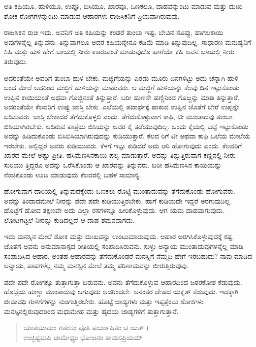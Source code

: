 {\small ಅತಿ ಕಹಿಯೂ, ಹುಳಿಯೂ, ಉಪ್ಪೂ, ಬಿಸಿಯೂ, ಖಾರವೂ, ಒಣಕಲೂ, ದಾಹವನ್ನುಂಟು ಮಾಡುವ ಮತ್ತು ದುಃಖ ಶೋಕ ರೋಗಗಳನ್ನುಂಟು ಮಾಡುವ ಆಹಾರಗಳು ರಾಜಸಿಕನಿಗೆ ಪ್ರಿಯವಾಗಿರುವುವು.}

ರಾಜಸಿಕನ ರುಚಿ ಇದು. ಅವನಿಗೆ ಅತಿ ಕಹಿಯನ್ನು ಕಂಡರೆ ತುಂಬಾ ಇಷ್ಟ. ಬೇವಿನ ಸೊಪ್ಪು, ಹಾಗಲಕಾಯಿ ಅವುಗಳನ್ನೆಲ್ಲ ತಿನ್ನುವನು. ತಿನ್ನುವಾಗಲೂ ಅದರ ಕಹಿಯನ್ನೇನೂ ಕಡಿಮೆ ಮಾಡಿ ತಿನ್ನುವುದಿಲ್ಲ. ಸಾಧಾರಣ ಮನುಷ್ಯನಿಗೆ ಸಿಹಿ ಮತ್ತು ಹುಳಿ ಹೇಗೆ ಬಾಯಲ್ಲಿ ನೀರು ಊರುವಂತೆ ಮಾಡುವುದೊ ಹಾಗೆಯೇ ಕಹಿ ಅವನ ಬಾಯಲ್ಲಿ ನೀರು ತರುವುದು.

ಅದರಂತೆಯೇ ಅವರಿಗೆ ತುಂಬಾ ಹುಳಿ ಬೇಕು. ಮಜ್ಜಿಗೆಯನ್ನು ಎರಡು ಮೂರು ದಿನಗಳಿಟ್ಟು ಅದು ಚೆನ್ನಾಗಿ ಹುಳಿ ಬಂದ ಮೇಲೆ ಅದರಿಂದ ಮಜ್ಜಿಗೆ ಹುಳಿಯನ್ನು ಮಾಡುವರು. ಆ ಮಜ್ಜಿಗೆ ಹುಳಿಯನ್ನು ಕೆಲವು ದಿನ ಇಟ್ಟುಕೊಂಡು ಉಪ್ಪಿನ ಕಾಯಿಯಂತೆ ಅಥವಾ ಗೊಜ್ಜಿನಂತೆ ತಿನ್ನುತ್ತಾರೆ. ಬರೀ ಹುಣಸೇ ಹಣ್ಣಿನಿಂದ ಗೊಜ್ಜನ್ನು ಮಾಡಿ ತಿನ್ನುತ್ತಾರೆ. ಅದರಂತೆಯೇ ಕೆಲವರಿಗೆ ಉಪ್ಪು ಜಾಸ್ತಿ ಬೇಕು. ಎಲೆಯಲ್ಲಿ ಪದಾರ್ಥಕ್ಕೆ ಹಾಕುವ ಉಪ್ಪಿನ ಜೊತೆಗೆ ಬೇರೆ ಉಪ್ಪನ್ನೇ ಬಡಿಸುವರು. ಜಾಸ್ತಿ ಬೇಕಾದರೆ ತೆಗೆದುಕೊಳ್ಳಲಿ ಎಂದು. ತೆಗೆದುಕೊಳ್ಳುವಾಗ ಕಾಫಿ, ಟೀ ಮುಂತಾದವು ತುಂಬಾ ಬಿಸಿಯಾಗಿರಬೇಕು. ಅದಿರುವ ಪಾತ್ರೆಯ ಬಿಸಿಯನ್ನು ಅವರ ಕೈ ತಡೆಯುವುದಿಲ್ಲ. ಒಂದು ಕೈಯಲ್ಲಿ ಬಟ್ಟೆ ಇಟ್ಟುಕೊಂಡು ಅದನ್ನು ಹಿಡಿದುಕೊಂಡು ಬಿಸಿಬಿಸಿಯಾಗಿರುವುದನ್ನು ಕುಡಿಯುತ್ತಾರೆ. ಕೆಲವ ರಿಗೆ ಟೀ ಅಥವಾ ಕಾಫಿ ಒಲೆಯ ಮೇಲೆಯೆ ಇರಬೇಕು. ಅಲ್ಲಿದ್ದರೆ ಅವರು ಕುಡಿಯುವರು. ಕೆಳಗೆ ಇಟ್ಟು ಕುಡಿದರೆ ಅದು ಆರಿ ಹೋಗುವುದು ಎಂದು. ಕೆಲವರಿಗೆ ಖಾರದ ಮೇಲೆ ಅಷ್ಟು ಪ್ರೀತಿ. ಹಸಿಮೆಣಸಿನಕಾಯಿ ಪಲ್ಯ ಮಾಡುತ್ತಾರೆ. ಅದನ್ನು ತಿನ್ನುತ್ತಿರುವಾಗ ಕಣ್ಣಿನಲ್ಲಿ ನೀರು ಸುರಿಯು ತ್ತಿದ್ದರೂ ಅದನ್ನು ಒರೆಸಿಕೊಂಡು ಆ ಖಾರವನ್ನು ತಿನ್ನುವರು. ಬರೀ ಹಸಿಮೆಣಸಿನ ಕಾಯಿಯನ್ನು ನೆಂಚಿಕೊಂಡು ಊಟ ಮಾಡುವುದು ಕೆಲವರಲ್ಲಿ ಬಹಳ ಸಾಮಾನ್ಯ.

ಹೋಗುವಾಗ ದಾರಿಯಲ್ಲಿ ತಿನ್ನುವುದಕ್ಕೆಂದು ಒಣಕಲು ರೊಟ್ಟಿ ಮುಂತಾದುವನ್ನು ತೆಗೆದುಕೊಂಡು ಹೋಗುವರು. ಅದನ್ನು ತಿಂದಾದಮೇಲೆ ನೀರನ್ನು ಪದೇ ಪದೇ ಕುಡಿಯುತ್ತಿರಬೇಕು. ಹಾಗೆ ಕುಡಿಯದೇ ಇದ್ದರೆ ಅರಗುವುದಿಲ್ಲ. ಹೊಟ್ಟೆಗೆ ಹೋದ ತಕ್ಷಣವೇ ಅದು ಎಲ್ಲಾ ರಸಗಳನ್ನೂ ಹೀರಿಕೊಳ್ಳುವುದು. ಆಗ ಯಮ ದಾಹವಾಗುವುದು. ಲೋಟಗಟ್ಟಲೆ ನೀರನ್ನು ಕುಡಿದಲ್ಲದೆ ಆ ದಾಹ ಶಮನವಾಗದು.

ಇದು ಮನಸ್ಸಿನ ಮೇಲೆ ಶೋಕ ಮತ್ತು ದುಃಖವನ್ನು ಉಂಟುಮಾಡುವುದು. ಆಹಾರ ಅರಗಿಸಿಕೊಳ್ಳುವುದಕ್ಕೆ ಕಷ್ಟ. ಜೊತೆಗೆ ಅವನು ಅನುಮಾನಾಸ್ಪದ ರೀತಿಯಲ್ಲಿ ಸಂಪಾದಿಸಿರುವನು. ಸುಳ್ಳು ಅನ್ಯಾಯ ಮುಂತಾದುವುಗಳನ್ನೆಲ್ಲ ಮಾಡಿ ಸಂಪಾದಿಸಿದ ಆಹಾರ. ಅಂತಹ ಆಹಾರವನ್ನು ತೆಗೆದುಕೊಂಡರೆ ಮನಸ್ಸಿಗೆ ನೆಮ್ಮದಿ ಹೇಗೆ ಇರಬಹುದು? ನಾವು ಮಾಡಿದ ಅನ್ಯಾಯ, ಪಾಪಗಳೆಲ್ಲ ನಮ್ಮ ಮನಸ್ಸಿನ ಮೇಲೆ ತಮ್ಮ ಪರಿಣಾಮವನ್ನು ಬೀರುತ್ತಿರುವುವು.

ಪದೇ ಪದೇ ರೋಗಕ್ಕೂ ತುತ್ತಾಗುತ್ತಾ ಬರುವನು. ಅವನು ತೆಗೆದುಕೊಳ್ಳುವ ಆಹಾರದಿಂದ ಜಠರಕೋಶ ಕೆಡುವುದು. ಹೊಟ್ಟೆಯ ಹುಣ್ಣು ಮುಂತಾದುವು ಆಗುವುದು ಅದರಿಂದಲೇ. ಅನಂತರ ದೇಹದ ಯಕೃತ್  ಕೆಡುವುದು. ಇದಕ್ಕಾಗಿ ಜೀವಾವಧಿ ಗುಳಿಗೆಗಳನ್ನು ನುಂಗುತ್ತಿರಬೇಕು. ಹೊಟ್ಟೆ ಜಾಡ್ಯಗಳು ಮತ್ತು ಇಪ್ಪತ್ತೆಂಟು ಶೋಕಗಳು ಮನಸ್ಸಿನಲ್ಲಿರುವುದರಿಂದ ಮಧುಮೇಹ  ಮತ್ತು ಹೃದಯ ಜಾಡ್ಯಗಳಿಗೆ ತುತ್ತಾಗುತ್ತಾನೆ.

\begin{verse}
ಯಾತಯಾಮಂ ಗತರಸಂ ಪೂತಿ ಪರ್ಯುಷಿತಂ ಚ ಯತ್ ।\\ಉಚ್ಛಿಷ್ಟಮಪಿ ಚಾಮೇಧ್ಯಂ ಭೋಜನಂ ತಾಮಸಪ್ರಿಯಮ್ 
\end{verse}

